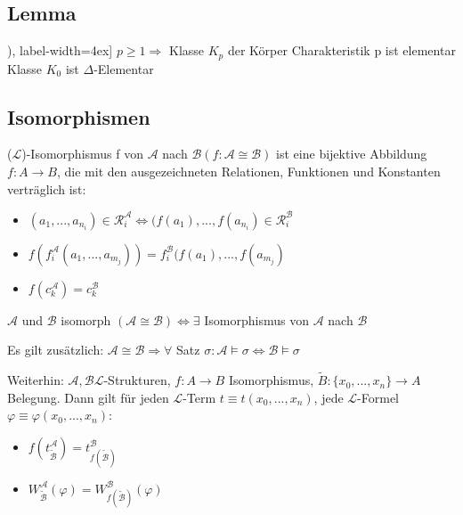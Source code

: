 \documentclass[12pt,a4paper]{article} %
\begin{document}
	\subsection{Lemma}
	\begin{tasks}[counter-format=(tsk[r]), label-width=4ex]
		\task $p \ge 1 \Rightarrow$ Klasse $K_p$ der Körper Charakteristik p ist elementar
		\task Klasse $K_0$ ist $\Delta$-Elementar 
	\end{tasks}
	
	\subsection{Isomorphismen}
	\begin{tasks}
		\task ($\mathcal{L}$)-Isomorphismus f von $\mathcal{A}$ nach $\mathcal{B} (f: \mathcal{A} \cong \mathcal{B})$ ist eine bijektive Abbildung $f: A \rightarrow B$, die mit den ausgezeichneten Relationen, Funktionen und Konstanten verträglich ist: \begin{itemize}
			\item $(a_1, ..., a_{n_i}) \in \mathcal{R}_i^{\mathcal{A}} \Leftrightarrow (f(a_1), ..., f(a_{n_i}) \in \mathcal{R}_i^{\mathcal{B}}$
			\item $f(f_i^{\mathcal{A}}(a_1, ..., a_{m_j})) = f_i^{\mathcal{B}}(f(a_1), ..., f(a_{m_j})$
			\item $f(c_k^{\mathcal{A}}) = c_k^{\mathcal{B}}$
		\end{itemize}
		\task $\mathcal{A}$ und $\mathcal{B}$ isomorph $(\mathcal{A} \cong \mathcal{B}) \Leftrightarrow \exists$ Isomorphismus von $\mathcal{A}$ nach $\mathcal{B}$
	\end{tasks}
	
	Es gilt zusätzlich: $\mathcal{A} \cong \mathcal{B} \Rightarrow \forall$ Satz $\sigma: \mathcal{A} \vDash \sigma \Leftrightarrow \mathcal{B} \vDash \sigma$ 
	
	Weiterhin: $\mathcal{A}, \mathcal{B} \mathcal{L}$-Strukturen, $f: A \rightarrow B$ Isomorphismus, $\tilde{B}: \{x_0, ..., x_n\} \rightarrow A$ Belegung. Dann gilt für jeden $\mathcal{L}$-Term $t \equiv t(x_0, ..., x_n)$, jede $\mathcal{L}$-Formel $\varphi \equiv \varphi(x_0, ..., x_n)$: \begin{itemize}
		\item $f(t_{\tilde{\mathcal{B}}}^{\mathcal{A}}) = t_{f(\tilde{\mathcal{B}})}^{\mathcal{B}}$
		\item $W_{\tilde{\mathcal{B}}}^{\mathcal{A}}(\varphi) = W_{f(\tilde{\mathcal{B}})}^{\mathcal{B}}(\varphi)$
	\end{itemize}
	
\end{document}
